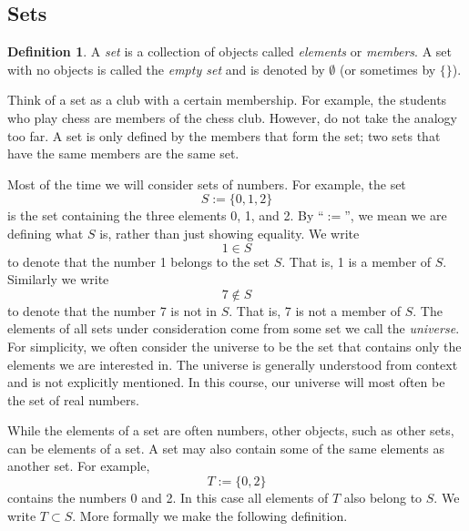 \documentclass[12pt]{book}
\newcommand{\myindex}[1]{#1\index{#1}}
\theoremstyle{plain}
\theoremstyle{remark}
\theoremstyle{definition}
\newtheorem{defn}[thm]{Definition}
\theoremstyle{exercise}
\theoremstyle{example}
\begin{document}
\subsection{Sets}

\begin{defn}
A \emph{\myindex{set}} is a collection of objects called
\emph{elements} or \emph{members}.  A set with
no objects is called the \emph{\myindex{empty set}} and is denoted by
$\emptyset$ (or sometimes by $\{ \}$).
\end{defn}

Think of a set as a club with a certain membership.  For
example, the students who play chess are members of the chess club.  However,
do not take the analogy too far.  A set is only defined by the members
that form the set; two sets that have the same members are the same set.

Most of the time we will consider sets
of numbers.  For example, the set
\begin{equation*}
S := \{ 0, 1, 2 \}
\end{equation*}
is the set containing
the three elements 0, 1, and 2.
By ``$:=$'', we mean we are defining what $S$ is, rather than
just showing equality.
We write
\begin{equation*}
1 \in S
\end{equation*}
to denote that the number 1 belongs to the set $S$.  That is, 1 is a member
of $S$.  Similarly we write
\begin{equation*}
7 \notin S
\end{equation*}
to denote that the number 7 is not in $S$.  That is, 7 is not a member of
$S$.
The elements of all sets under consideration come from some set we call the
\emph{\myindex{universe}}.  For simplicity,
we often consider the universe to be the set that contains only the elements
we are interested in.
The universe is generally understood from context
and is not explicitly mentioned.  In this course, our universe will
most often be the set of real numbers.

While the elements of a set are often numbers,
other objects, such as other sets, can be elements of a set.
A set may also contain some of the same elements as another set.  For example,
\begin{equation*}
T := \{ 0, 2 \}
\end{equation*}
contains the numbers 0 and 2.  In this case all elements of $T$ also
belong to $S$.  We write $T \subset S$.  More formally we make the
following definition.
\end{document}
